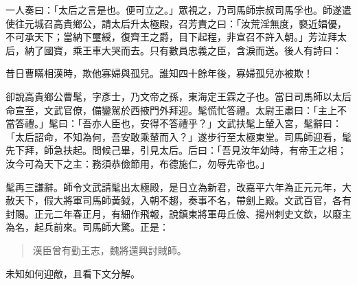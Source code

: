 一人奏曰：「太后之言是也。便可立之。」眾視之，乃司馬師宗叔司馬孚也。師遂遣使往元城召高貴鄉公，請太后升太極殿，召芳責之曰：「汝荒淫無度，褻近娼優，不可承天下；當納下璽綬，復齊王之爵，目下起程，非宣召不許入朝。」芳泣拜太后，納了國寶，乘王車大哭而去。只有數員忠義之臣，含淚而送。後人有詩曰：

昔日曹瞞相漢時，欺他寡婦與孤兒。誰知四十餘年後，寡婦孤兒亦被欺！

卻說高貴鄉公曹髦，字彥士，乃文帝之孫，東海定王霖之子也。當日司馬師以太后命宣至，文武官僚，備鑾駕於西掖門外拜迎。髦慌忙答禮。太尉王肅曰：「主上不當答禮。」髦曰：「吾亦人臣也，安得不答禮乎？」文武扶髦上輦入宮，髦辭曰：「太后詔命，不知為何，吾安敢乘輦而入？」遂步行至太極東堂。司馬師迎看，髦先下拜，師急扶起。問候己畢，引見太后。后曰：「吾見汝年幼時，有帝王之相；汝今可為天下之主：務須恭儉節用，布德施仁，勿辱先帝也。」

髦再三謙辭。師令文武請髦出太極殿，是日立為新君，改嘉平六年為正元元年，大赦天下，假大將軍司馬師黃鉞，入朝不趨，奏事不名，帶劍上殿。文武百官，各有封賜。正元二年春正月，有細作飛報，說鎮東將軍毋丘儉、揚州刺史文欽，以廢主為名，起兵前來。司馬師大驚。正是：

\begin{quote}
漢臣曾有勤王志，魏將還興討賊師。
\end{quote}

未知如何迎敵，且看下文分解。
